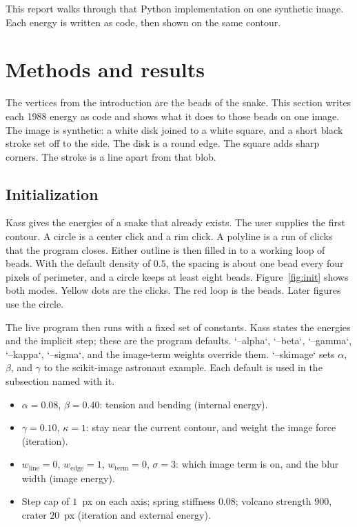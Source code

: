 \documentclass[11pt,twocolumn]{article}
\begin{document}
This report walks through that Python implementation on one synthetic image. Each energy is written as code, then shown on the same contour.

\section{Methods and results}

The vertices from the introduction are the beads of the snake. This section writes each 1988 energy as code and shows what it does to those beads on one image. The image is synthetic: a white disk joined to a white square, and a short black stroke set off to the side. The disk is a round edge. The square adds sharp corners. The stroke is a line apart from that blob.

\subsection{Initialization}

Kass gives the energies of a snake that already exists. The user supplies the first contour. A circle is a center click and a rim click. A polyline is a run of clicks that the program closes. Either outline is then filled in to a working loop of beads. With the default density of $0.5$, the spacing is about one bead every four pixels of perimeter, and a circle keeps at least eight beads. Figure~\ref{fig:init} shows both modes. Yellow dots are the clicks. The red loop is the beads. Later figures use the circle.

The live program then runs with a fixed set of constants. Kass states the energies and the implicit step; these are the program defaults. `--alpha`, `--beta`, `--gamma`, `--kappa`, `--sigma`, and the image-term weights override them. `--skimage` sets $\alpha$, $\beta$, and $\gamma$ to the scikit-image astronaut example. Each default is used in the subsection named with it.
\begin{itemize}
  \item $\alpha=0.08$, $\beta=0.40$: tension and bending (internal energy).
  \item $\gamma=0.10$, $\kappa=1$: stay near the current contour, and weight the image force (iteration).
  \item $w_{\mathrm{line}}=0$, $w_{\mathrm{edge}}=1$, $w_{\mathrm{term}}=0$, $\sigma=3$: which image term is on, and the blur width (image energy).
  \item Step cap of $1$~px on each axis; spring stiffness $0.08$; volcano strength $900$, crater $20$~px (iteration and external energy).
\end{itemize}
\end{document}
